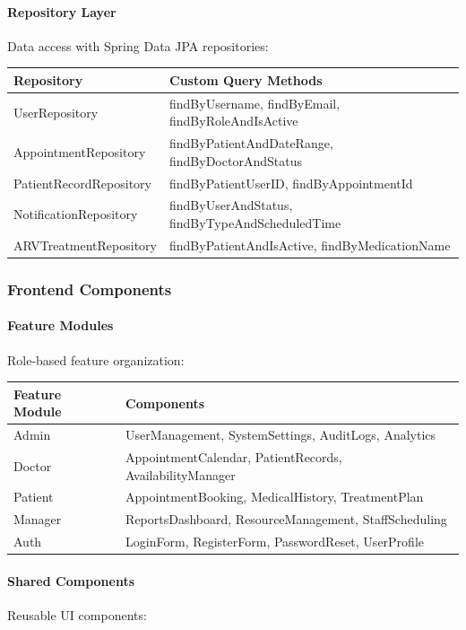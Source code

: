 \documentclass[12pt,a4paper]{article}
\begin{document}
\paragraph{Repository Layer}
Data access with Spring Data JPA repositories:

\begin{longtable}{|p{3cm}|p{9cm}|}
\hline
\textbf{Repository} & \textbf{Custom Query Methods} \\
\hline
UserRepository & findByUsername, findByEmail, findByRoleAndIsActive \\
\hline
AppointmentRepository & findByPatientAndDateRange, findByDoctorAndStatus \\
\hline
PatientRecordRepository & findByPatientUserID, findByAppointmentId \\
\hline
NotificationRepository & findByUserAndStatus, findByTypeAndScheduledTime \\
\hline
ARVTreatmentRepository & findByPatientAndIsActive, findByMedicationName \\
\hline
\end{longtable}

\subsubsection{Frontend Components}

\paragraph{Feature Modules}
Role-based feature organization:

\begin{longtable}{|p{3cm}|p{9cm}|}
\hline
\textbf{Feature Module} & \textbf{Components} \\
\hline
Admin & UserManagement, SystemSettings, AuditLogs, Analytics \\
\hline
Doctor & AppointmentCalendar, PatientRecords, AvailabilityManager \\
\hline
Patient & AppointmentBooking, MedicalHistory, TreatmentPlan \\
\hline
Manager & ReportsDashboard, ResourceManagement, StaffScheduling \\
\hline
Auth & LoginForm, RegisterForm, PasswordReset, UserProfile \\
\hline
\end{longtable}

\paragraph{Shared Components}
Reusable UI components:
\end{document}
